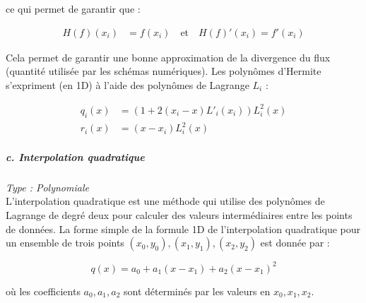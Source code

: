 \vspace{-0,3 cm}

ce qui permet de garantir que :

\vspace{-0,2 cm}

\begin{equation}
    \begin{aligned}
        H(f)(x_i) &= f(x_i) \quad \text{et} \quad H(f)'(x_i) = f'(x_i)
    \end{aligned}
\end{equation}



Cela permet de garantir une bonne approximation de la divergence du flux (quantité utilisée par les schémas numériques). Les polynômes d'Hermite s'expriment (en 1D) à l'aide des polynômes de Lagrange $L_i$ :

\begin{equation}
    \begin{aligned}
        q_i(x) &= \left(1 + 2(x_i - x) L'_i(x_i)\right) L_i^2(x) \\
        r_i(x) &= (x - x_i) L_i^2(x)
    \end{aligned}
\end{equation}


\subparagraph{c. Interpolation quadratique \cite{alexis}}
\textit{Type : Polynomiale} \\
\phantom{----}L'interpolation quadratique est une méthode qui utilise des polynômes de Lagrange de degré deux pour calculer des valeurs intermédiaires entre les points de données.
La forme simple de la formule 1D de l'interpolation quadratique pour un ensemble de trois points \( (x_0, y_0), (x_1, y_1), (x_2, y_2) \) est donnée par :

\vspace{-0,3 cm}

\begin{equation}
    q(x) = a_0 + a_1(x - x_1) + a_2(x - x_1)^2
\end{equation}

où les coefficients \( a_0, a_1, a_2 \) sont déterminés par les valeurs en \( x_0, x_1, x_2 \).

